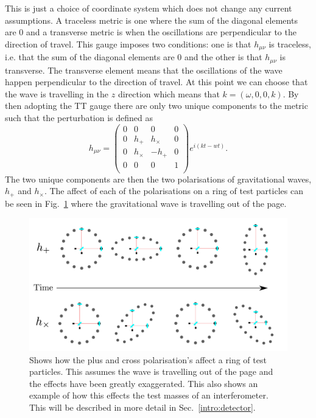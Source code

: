 This is just a choice of coordinate system which does not change any current assumptions. A traceless metric is one where the sum of the diagonal elements are 0 and a transverse metric is when the oscillations are perpendicular to the direction of travel. 
This gauge imposes two conditions: one is that $h_{\mu \nu}$ is traceless, i.e. that the sum of the diagonal elements are 0 and the other is that $h_{\mu \nu}$ is transverse. 
The transverse element means that the oscillations of the wave happen perpendicular to the direction of travel.
At this point we can choose that the wave is travelling in the $z$ direction which means that $k = (\omega,0,0,k)$.
By then adopting the TT gauge there are only two unique components to the metric such that the perturbation is defined as
\begin{equation}
\label{intro:gw:gravwave}
h_{\mu \nu} = \left( 
\begin{matrix}
0 & 0 & 0 & 0 \\
0 & h_{+} & h_{\times} & 0 \\
0 & h_{\times} & -h_{+} & 0 \\
0 & 0 & 0 & 1 \\
\end{matrix}
\right) 
e^{i(kt - wt)}.
\end{equation}
The two unique components are then the two polarisations of gravitational waves, $h_{+}$ and $h_{\times}$.
The affect of each of the polarisations on a ring of test particles can be seen in Fig.~\ref{gw:polarisations} where the gravitational wave is travelling out of the page.

\begin{figure}[h]
    \centering
    \includegraphics[width=\textwidth]{C1_intro/polarisation_ring.pdf}
    \caption[Plus and Cross polarisations]{Shows how the plus and cross polarisation's affect a ring of test particles. This assumes the wave is travelling out of the page and the effects have been greatly exaggerated. This also shows an example of how this effects the test masses of an interferometer. This will be described in more detail in Sec.~\ref{intro:detector}.}
    \label{gw:polarisations}
\end{figure}




